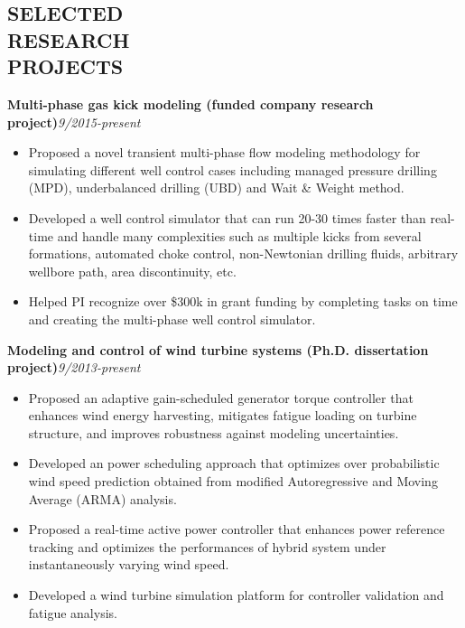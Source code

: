 \documentclass[margin, 9pt]{res} %
\begin{document}
\begin{resume}
\section{SELECTED\\ RESEARCH\\ PROJECTS}
{\textbf{Multi-phase gas kick modeling  (funded company research project)}}\hfill\textit{9/2015-present}\\
\vspace*{-10pt}
\begin{itemize}[leftmargin=*] \itemsep -3pt
\vspace*{-5pt}
	\item Proposed a novel transient multi-phase flow modeling methodology for simulating different well control cases including managed pressure drilling (MPD), underbalanced drilling (UBD) and Wait \& Weight method.
	\item Developed a well control simulator that can run 20-30 times faster than real-time and handle many complexities such as multiple kicks from several formations,  automated choke control,  non-Newtonian drilling fluids, arbitrary wellbore path, area discontinuity, etc.
    \item Helped PI recognize over \$300k in grant funding by completing tasks on time and creating the multi-phase well control simulator.
\end{itemize}

\medskip
{\textbf{Modeling and control of wind turbine systems (Ph.D. dissertation project)}}\hfill\textit{9/2013-present}\\
\vspace*{-10pt}
\begin{itemize}[leftmargin=*] \itemsep -3pt
\vspace*{-5pt}
    \item Proposed an adaptive gain-scheduled generator torque controller that enhances wind energy harvesting, mitigates fatigue loading on turbine structure, and improves robustness against modeling uncertainties.
	\item Developed an  power scheduling approach that optimizes over probabilistic wind speed prediction obtained from modified Autoregressive and Moving Average (ARMA) analysis.
	\item Proposed a real-time active power controller that enhances power reference tracking and optimizes the performances of hybrid system under instantaneously varying wind speed.
    \item Developed a wind turbine simulation platform  for controller validation and fatigue analysis.
\end{itemize}


\end{resume}
\end{document}
